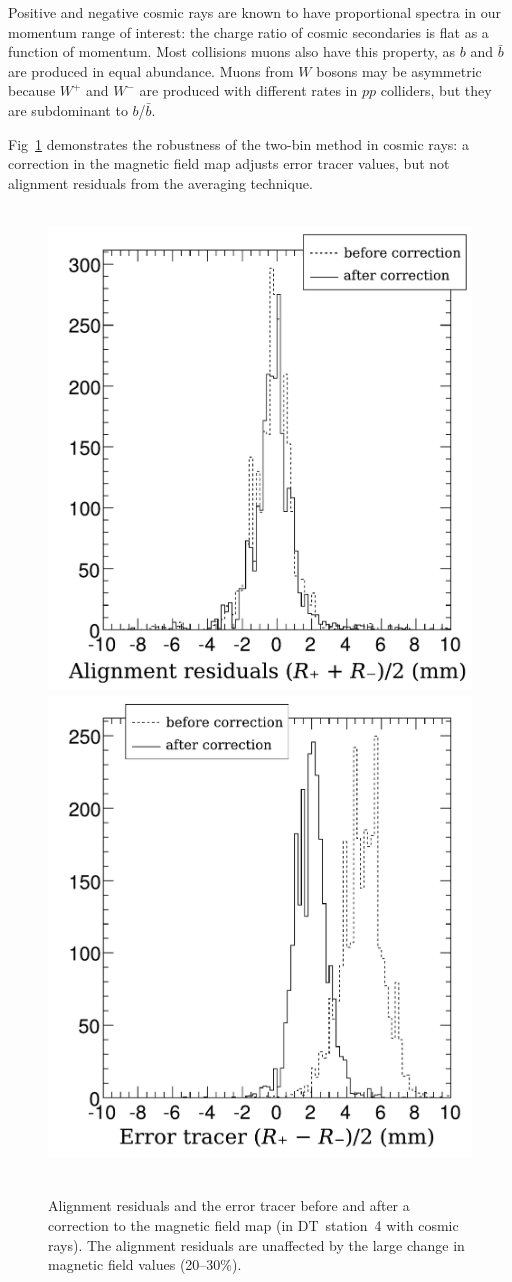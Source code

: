 \documentclass[12pt]{article}
\begin{document}
Positive and negative cosmic rays are known to have proportional
spectra in our momentum range of interest: the charge ratio of cosmic
secondaries is flat as a function of momentum.  Most collisions muons
also have this property, as $b$ and $\bar{b}$ are produced in
equal abundance.  Muons from $W$ bosons may be asymmetric because
$W^+$ and $W^-$ are produced with different rates in $pp$ colliders,
but they are subdominant to $b$/$\bar{b}$.

Fig~\ref{fig:twobin_robust} demonstrates the robustness of the
two-bin method in cosmic rays: a correction in the magnetic field map
adjusts error tracer values, but not alignment residuals from the
averaging technique.

\begin{figure}
\mbox{ } \hfill \includegraphics[height=7 cm]{robustness_alignment1.pdf} \hfill
\includegraphics[height=7 cm]{robustness_errortracer2.pdf} \hfill \mbox{ }
\caption{Alignment residuals and the error tracer before and after a correction to the magnetic field map (in DT~station~4 with cosmic rays).  The alignment residuals are unaffected by the large change in magnetic field values (20--30\%). \label{fig:twobin_robust}}
\end{figure}
\end{document}
